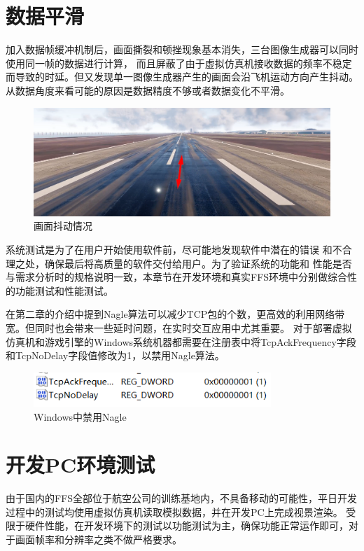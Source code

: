 \section{数据平滑}
加入数据帧缓冲机制后，画面撕裂和顿挫现象基本消失，三台图像生成器可以同时使用同一帧的数据进行计算，
而且屏蔽了由于虚拟仿真机接收数据的频率不稳定而导致的时延。但又发现单一图像生成器产生的画面会沿飞机运动方向产生抖动。
从数据角度来看可能的原因是数据精度不够或者数据变化不平滑。
\begin{figure}[h!]
    \begin{center}
        \includegraphics[width=\textwidth]{pictures/jitter.png}
        \caption{画面抖动情况}
        \label{tear}
    \end{center}
\end{figure}
\par
系统测试是为了在用户开始使用软件前，尽可能地发现软件中潜在的错误
和不合理之处，确保最后将高质量的软件交付给用户。为了验证系统的功能和
性能是否与需求分析时的规格说明一致，本章节在开发环境和真实FFS环境中分别做综合性的功能测试和性能测试。

在第二章的介绍中提到Nagle算法可以减少TCP包的个数，更高效的利用网络带宽。但同时也会带来一些延时问题，在实时交互应用中尤其重要。
对于部署虚拟仿真机和游戏引擎的Windows系统机器都需要在注册表中将TcpAckFrequency字段和TcpNoDelay字段值修改为1，以禁用Nagle算法。
\begin{figure}[h!]
    \begin{center}
        \includegraphics[width=0.8\textwidth]{pictures/nagle.png}
        \caption{Windows中禁用Nagle}
    \end{center}
\end{figure}
\section{开发PC环境测试}
由于国内的FFS全部位于航空公司的训练基地内，不具备移动的可能性，平日开发过程中的测试均使用虚拟仿真机读取模拟数据，并在开发PC上完成视景渲染。
受限于硬件性能，在开发环境下的测试以功能测试为主，确保功能正常运作即可，对于画面帧率和分辨率之类不做严格要求。

